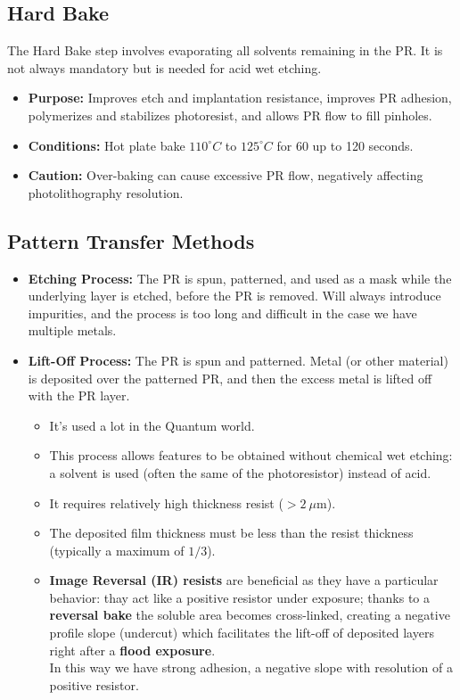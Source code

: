 \documentclass{report}
\begin{document}
\subsection{Hard Bake}
The Hard Bake step involves evaporating all solvents remaining in the PR. It is not always mandatory but is needed for acid wet etching. 
\begin{itemize} 
    \item \textbf{Purpose:} Improves etch and implantation resistance, improves PR adhesion, polymerizes and stabilizes photoresist, and allows PR flow to fill pinholes. 
    \item \textbf{Conditions:} Hot plate bake $110^{\circ}C$ to $125^{\circ}C$ for 60 up to 120 seconds. 
    \item \textbf{Caution:} Over-baking can cause excessive PR flow, negatively affecting photolithography resolution. 
\end{itemize}
\subsection{Pattern Transfer Methods}
\begin{itemize} 
    \item \textbf{Etching Process:} The PR is spun, patterned, and used as a mask while the underlying layer is etched, before the PR is removed. Will always introduce impurities, and the process is too long and difficult in the case we have multiple metals. 
    \item \textbf{Lift-Off Process:} The PR is spun and patterned. Metal (or other material) is deposited over the patterned PR, and then the excess metal is lifted off with the PR layer. 
    \begin{itemize} 
        \item It's used a lot in the Quantum world.
        \item This process allows features to be obtained without chemical wet etching: a solvent is used (often the same of the photoresistor) instead of acid.
        \item It requires relatively high thickness resist ($>2~\mu \text{m}$). 
        \item The deposited film thickness must be less than the resist thickness (typically a maximum of $1/3$). 
        \item \textbf{Image Reversal (IR) resists} are beneficial as they have a particular behavior: thay act like a positive resistor under exposure; thanks to a \textbf{reversal bake} the soluble area becomes cross-linked, creating a negative profile slope (undercut) which facilitates the lift-off of deposited layers right after a \textbf{flood exposure}.
        \\In this way we have strong adhesion, a negative slope with resolution of a positive resistor.
    \end{itemize} 
\end{itemize}
\end{document}
